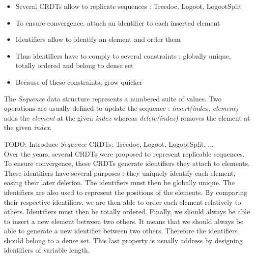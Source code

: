 \documentclass{article}
\begin{document}
\begin{itemize}
    \item Several \acp{CRDT} allow to replicate sequences : Treedoc, Logoot, LogootSplit
    \item To ensure convergence, attach an identifier to each inserted element
    \item Identifiers allow to identify an element and order them
    \item Thus identifiers have to comply to several constraints : globally unique, totally ordered and belong to dense set
    \item Because of these constraints, grow quicker
\end{itemize}

The \emph{Sequence} data structure represents a numbered suite of values.
Two operations are usually defined to update the sequence :
\emph{insert(index, element)} adds the \emph{element} at the given \emph{index}
whereas \emph{delete(index)} removes the element at the given \emph{index}.

TODO: Introduce \emph{Sequence} \acp{CRDT}: Treedoc, Logoot, LogootSplit, ... \\
Over the years, several \acp{CRDT} were proposed to represent replicable sequences.
To ensure convergence, these \acp{CRDT} generate identifiers they attach to elements.
These identifiers have several purposes : they uniquely identify each element, easing their later deletion.
The identifiers must then be globally unique.
The identifiers are also used to represent the positions of the elements.
By comparing their respective identifiers, we are then able to order each element relatively to others.
Identifiers must then be totally ordered.
Finally, we should always be able to insert a new element between two others.
It means that we should always be able to generate a new identifier between two others.
Therefore the identifiers should belong to a dense set.
This last property is usually address by designing identifiers of variable length.
\end{document}
